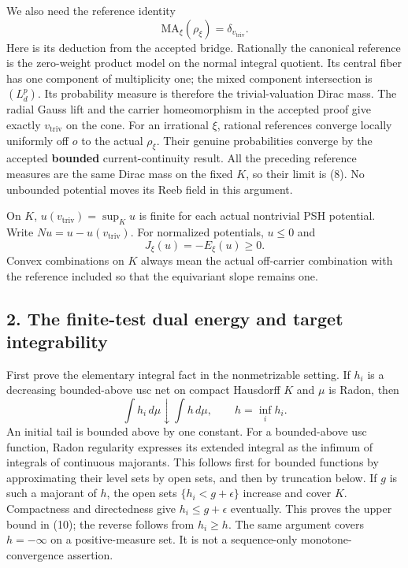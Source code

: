 \documentclass[
  10pt,
]{article}
\begin{document}
We also need the reference identity \[
                    \mathrm{MA}_\xi(\rho_\xi)=\delta_{v_{\mathrm{triv}}}.                    \tag{8}
\] Here is its deduction from the accepted bridge. Rationally the
canonical reference is the zero-weight product model on the normal
integral quotient. Its central fiber has one component of multiplicity
one; the mixed component intersection is \((L_d^p)\). Its probability
measure is therefore the trivial-valuation Dirac mass. The radial Gauss
lift and the carrier homeomorphism in the accepted proof give exactly
\(v_{\mathrm{triv}}\) on the cone. For an irrational \(\xi\), rational
references converge locally uniformly off \(o\) to the actual
\(\rho_\xi\). Their genuine probabilities converge by the accepted
\textbf{bounded} current-continuity result. All the preceding reference
measures are the same Dirac mass on the fixed \(K\), so their limit is
(8). No unbounded potential moves its Reeb field in this argument.

On \(K\), \(u(v_{\mathrm{triv}})=\sup_Ku\) is finite for each actual
nontrivial PSH potential. Write \(Nu=u-u(v_{\mathrm{triv}})\). For
normalized potentials, \(u\leq0\) and \[
              J_\xi(u)=-E_\xi(u)\geq0.                               \tag{9}
\] Convex combinations on \(K\) always mean the actual off-carrier
combination with the reference included so that the equivariant slope
remains one.

\subsection{2. The finite-test dual energy and target
integrability}\label{the-finite-test-dual-energy-and-target-integrability}

First prove the elementary integral fact in the nonmetrizable setting.
If \(h_i\) is a decreasing bounded-above usc net on compact Hausdorff
\(K\) and \(\mu\) is Radon, then \[
                  \int h_i\,d\mu\downarrow\int h\,d\mu,
             \qquad h=\inf_i h_i.                                    \tag{10}
\] An initial tail is bounded above by one constant. For a bounded-above
usc function, Radon regularity expresses its extended integral as the
infimum of integrals of continuous majorants. This follows first for
bounded functions by approximating their level sets by open sets, and
then by truncation below. If \(g\) is such a majorant of \(h\), the open
sets \(\{h_i<g+\epsilon\}\) increase and cover \(K\). Compactness and
directedness give \(h_i\leq g+\epsilon\) eventually. This proves the
upper bound in (10); the reverse follows from \(h_i\geq h\). The same
argument covers \(h=-\infty\) on a positive-measure set. It is not a
sequence-only monotone-convergence assertion.
\end{document}
